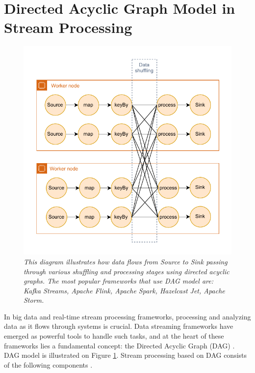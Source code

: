 \section{Directed Acyclic Graph Model in Stream Processing}\label{subsec:dataflow-graph}

\begin{figure}[H]
    \centering
    \includegraphics[width=1\textwidth]{figures/data-shuffling}
    \caption{\textit{This diagram illustrates how data flows from Source to Sink
        passing through various shuffling and processing stages using directed acyclic graphs.
    The most popular frameworks that use DAG model are: Kafka Streams, Apache Flink, Apache Spark, Hazelcast Jet, Apache Storm.}}
    \label{fig:data-shuffling}
\end{figure}

In big data and real-time stream processing frameworks, processing and analyzing data as it flows through systems is crucial. Data streaming frameworks have emerged as powerful tools to handle such tasks,
and at the heart of these frameworks lies a fundamental concept: the Directed Acyclic Graph (DAG) \cite{flinkCheckpoints, Dataflow2015, flink_dag, kafka_streams_topology}.
DAG model is illustrated on Figure \ref{fig:data-shuffling}.
Stream processing based on DAG consists of the following components \cite{kafka_streams_topology, kleppmann2017, spark_structured_streaming}.

